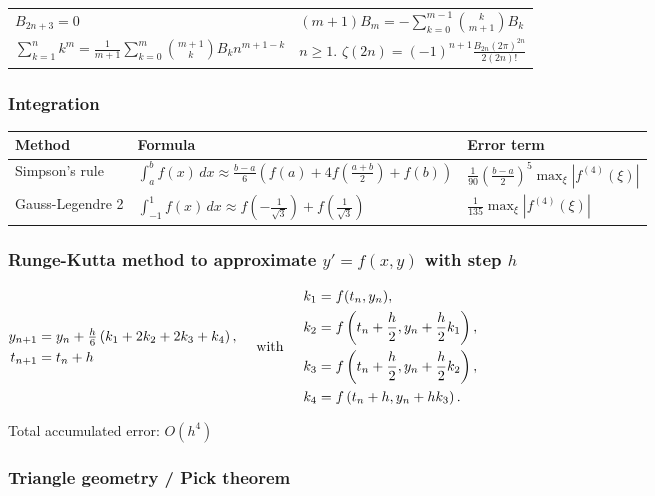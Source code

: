 \documentclass[landscape,a4paper,twocolumn,10pt]{report}
\begin{document}
\begin{tabular}{@{}ll@{}}
$B_{2n+3} = 0$
&
$(m+1) B_m = - \sum_{k=0}^{m-1}\binom{k}{m+1}B_k$
\\
$\sum_{k=1}^nk^m=\frac{1}{m+1}\sum_{k=0}^m\binom{m+1}{k}B_kn^{m+1-k}$
&
$n\geq 1$. $\zeta(2n) = (-1)^{n+1} \frac{B_{2n} (2\pi)^{2n}}{2(2n)!}$
\end{tabular}
\medskip

\subsubsection*{Integration}

\begin{tabular}{@{}ll|l@{}}
Method & Formula & Error term \\
\hline
Simpson's rule &
$\int_a^b f(x) \, dx \approx \frac{b-a}{6} (f(a) + 4 f(\frac{a+b}{2}) + f(b))$ &
$\frac{1}{90}\left(\frac{b-a}{2}\right)^5 \max_\xi |f^{(4)}(\xi)|$
\\

Gauss-Legendre 2 &
$\int_{-1}^1 f(x) \, dx \approx f(-\frac{1}{\sqrt{3}}) + f(\frac{1}{\sqrt{3}})$ &
$\frac{1}{135} \max_\xi |f^{(4)}(\xi)|$
\end{tabular}

\subsubsection*{Runge-Kutta method to approximate $y'=f(x,y)$ with step $h$}
$\begin{aligned}
y_{n+1} &= y_n + \tfrac{h}{6}\left(k_1 + 2k_2 + 2k_3 + k_4 \right),\\
t_{n+1} &= t_n + h \\
\end{aligned}
\hspace{0.5cm} \mbox{with} \hspace{0.5cm}
\begin{aligned}
 k_1 &= f(t_n, y_n), \\
 k_2 &= f\left(t_n + \frac{h}{2}, y_n + \frac{h}{2}k_1\right), \\
 k_3 &= f\left(t_n + \frac{h}{2}, y_n + \frac{h}{2}k_2\right), \\
 k_4 &= f\left(t_n + h, y_n + h k_3\right).
\end{aligned}
$

\noindent Total accumulated error: $O(h^4)$

\subsubsection*{Triangle geometry / Pick theorem}
\end{document}

